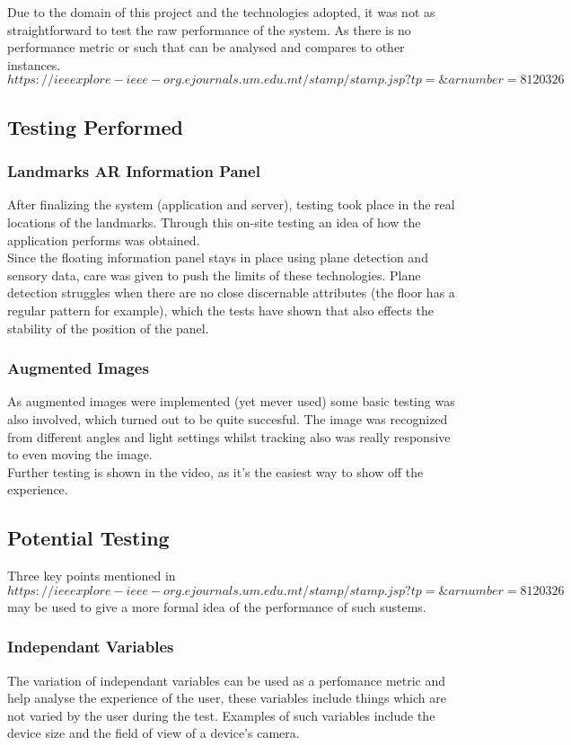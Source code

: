 Due to the domain of this project and the technologies adopted, it was not as straightforward to 
test the raw performance of the system. As there is no performance metric or such that can be 
analysed and compares to other instances. \[https://ieeexplore-ieee-org.ejournals.um.edu.mt/stamp/stamp.jsp?tp=\&arnumber=8120326\] 
\subsection{Testing Performed}

\subsubsection{Landmarks AR Information Panel}
After finalizing the system (application and server), testing took place in the 
real locations of the landmarks. Through this on-site testing an idea of how the application 
performs was obtained.\\
Since the floating information panel stays in place using plane detection and sensory data, care 
was given to push the limits of these technologies. Plane detection struggles when there are 
no close discernable attributes (the floor has a regular pattern for example), which the tests 
have shown that also effects the stability of the position of the panel. 
\subsubsection{Augmented Images}
As augmented images were implemented (yet mever used) some basic testing was also involved, 
which turned out to be quite succesful. The image was recognized from different angles and 
light settings whilst tracking also was really responsive to even moving the image.  
\\
Further testing is shown in the video, as it's the easiest way to show off the experience.
\subsection{Potential Testing}
Three key points mentioned in \[https://ieeexplore-ieee-org.ejournals.um.edu.mt/stamp/stamp.jsp?tp=\&arnumber=8120326\] 
may be used to give a more formal idea of the performance of such sustems. 
\subsubsection{Independant Variables}
The variation of independant variables can be used as a perfomance metric and help analyse 
the experience of the user, these variables include things which are not varied by the user during 
the test. Examples of such variables include the device size and the field of view of a device's 
camera.\\
